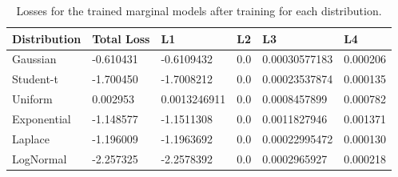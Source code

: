 \begin{table}[h]
\centering
\caption{Losses for the trained marginal models after training for each distribution.}
\begin{tabular}{llllll}
\toprule
\textbf{Distribution} & \textbf{Total Loss} & \textbf{L1} & \textbf{L2} & \textbf{L3} & \textbf{L4} \\
\midrule
Gaussian & -0.610431 & -0.6109432 & 0.0 & 0.00030577183 & 0.000206 \\
Student-t & -1.700450 & -1.7008212 & 0.0 & 0.00023537874 & 0.000135 \\
Uniform & 0.002953 & 0.0013246911 & 0.0 & 0.0008457899 & 0.000782 \\
Exponential & -1.148577 & -1.1511308 & 0.0 & 0.0011827946 & 0.001371 \\
Laplace & -1.196009 & -1.1963692 & 0.0 & 0.00022995472 & 0.000130 \\
LogNormal & -2.257325 & -2.2578392 & 0.0 & 0.0002965927 & 0.000218 \\
\end{tabular}
\label{tab:MarginalFinalLosses}
\end{table}

